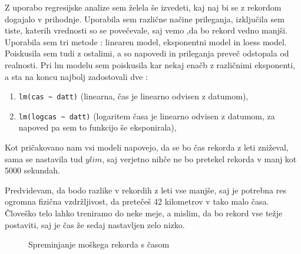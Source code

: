\documentclass[11pt,a4paper]{article}
\begin{document}
Z uporabo regresijske analize sem želela še izvedeti, kaj naj bi se z rekordom dogajalo v prihodnje. Uporabila sem različne načine prileganja, izključila sem tiste, katerih vrednosti so se povečevale, saj vemo ,da bo rekord vedno manjši.
Uporabila sem tri metode : linearen model, eksponentni model in loess model. Poiskusila sem tudi z ostalimi, a so napovedi in prileganja preveč odstopala od realnosti.
Pri lm modelu sem poiskusila kar nekaj enačb z različnimi eksponenti, a sta na koncu najbolj zadostovali dve :
\begin{enumerate}
\item{\verb|lm(cas ~ datt)| (linearna, čas je linearno odvisen z datumom),}
\item{\verb|lm(logcas ~ datt)| (logaritem časa je linearno odvisen z datumom, za napoved pa sem to funkcijo še eksponirala),}

\end{enumerate}

Kot pričakovano nam vsi modeli napovejo, da se bo čas rekorda z leti zniževal, sama se nastavila tud $ylim$, saj verjetno nihče ne bo pretekel rekorda v manj kot 5000 sekundah.

Predvidevam, da bodo razlike v rekordih z leti vse manjše, saj je potrebna res ogromna fizična vzdržljivost, da  pretečeš 42 kilometrov v tako malo časa. Človeško telo lahko treniramo do neke meje, a mislim, da bo rekord vse težje postaviti, saj je čas že sedaj nastavljen zelo nizko.

\begin{figure}[H]
  \caption{Spreminjanje moškega rekorda s časom}
  \label{fig:Slika 4}
\end{figure}
\end{document}
